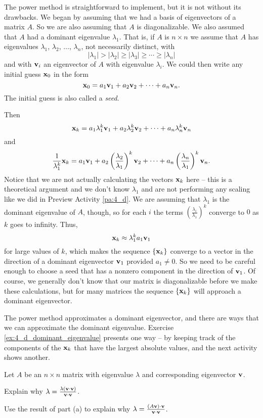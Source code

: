 The power method is straightforward to implement, but it is not without its drawbacks. We began by assuming that we had a basis of eigenvectors of a matrix $A$. So we are also assuming that $A$ is diagonalizable. We also assumed that $A$ had a dominant eigenvalue $\lambda_1$. That is, if $A$ is $n \times n$ we assume that $A$ has eigenvalues $\lambda_1$, $\lambda_2$, $\ldots$, $\lambda_n$, not necessarily distinct, with 
\[|\lambda_1| > |\lambda_2| \geq |\lambda_3| \geq \cdots \geq |\lambda_n|\]
and with $\mathbf{v}_i$ an eigenvector of $A$ with eigenvalue $\lambda_i$. We could then write any initial guess $\mathbf{x}_0$ in the form 
\[\mathbf{x}_0 = a_1 \mathbf{v}_1 +  a_2\mathbf{v}_2 + \cdots + a_n \mathbf{v}_n.\]
The initial guess is also called a \emph{seed}. 

Then 
\[\mathbf{x}_k = a_1 \lambda_1^k \mathbf{v}_1 + a_2 \lambda_2^k \mathbf{v}_2 + \cdots + a_n \lambda_n^k \mathbf{v}_n\]
 and
\begin{equation} \label{eq:4_e_3} 
\frac{1}{\lambda_1^k} \mathbf{x}_k = a_1 \mathbf{v}_1 + a_2 \left(\frac{\lambda_2}{\lambda_1}\right)^k \mathbf{v}_2 + \cdots + a_n \left(\frac{\lambda_n}{\lambda_1}\right)^k \mathbf{v}_n.
\end{equation} 
Notice that we are not actually calculating the vectors $\mathbf{x}_k$ here -- this is a theoretical argument and we don't know $\lambda_1$ and are not performing any scaling like we did in Preview Activity \ref{pa:4_d}. We are assuming that $\lambda_1$ is the dominant eigenvalue of $A$, though, so for each $i$ the terms $\left(\frac{\lambda_i}{\lambda_1}\right)^k$ converge to $0$ as $k$ goes to infinity. Thus, 
\[\mathbf{x}_k \approx \lambda_1^k a_1 \mathbf{v}_1\]
 for large values of $k$, which makes the sequence $\{\mathbf{x}_k\}$ converge to a vector in the direction of a dominant eigenvector $\mathbf{v}_1$ provided $a_1 \neq 0$. So we need to be careful enough to choose a seed that has a nonzero component in the direction of $\mathbf{v}_1$. Of course, we generally don't know that our matrix is diagonalizable before we make these calculations, but for many matrices the sequence $\{\mathbf{x}_k\}$ will approach a dominant eigenvector. 
 
The power method approximates a dominant eigenvector, and there are ways that we can approximate the dominant eigenvalue. Exercise \ref{ex:4_d_dominant_eigenvalue} presents one way -- by keeping track of the components of the $\mathbf{x}_k$ that have the largest absolute values, and the next activity shows another. 
 
 \begin{activity} \label{act:4_d_Rayleigh} Let $A$ be an $n \times n$ matrix with eigenvalue $\lambda$ and corresponding eigenvector $\mathbf{v}$. 
 \ba
 \item Explain why $\lambda = \frac{\lambda (\mathbf{v} \cdot \mathbf{v})}{\mathbf{v} \cdot \mathbf{v}}$. 
 
\item Use the result of part (a) to explain why $\lambda = \frac{(A\mathbf{v}) \cdot \mathbf{v}}{\mathbf{v} \cdot \mathbf{v}}$. 


\ea

\end{activity}

